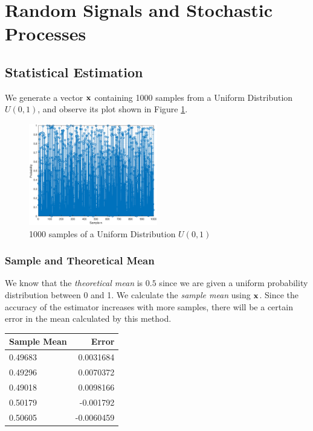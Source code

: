 \documentclass{article}
\begin{document}
\section{Random Signals and Stochastic Processes}
\vspace{0.5cm}

\subsection{Statistical Estimation}

We generate a vector $\bf x$ containing 1000 samples from a Uniform Distribution $U(0,1)$, and observe its plot shown in Figure \ref{fig:mean_norm}. 

\begin{figure}[h!]
\centering
\includegraphics[width=0.5\textwidth]{mean_norm}
\caption{\label{fig:mean_norm} 1000 samples of a Uniform Distribution $U(0,1)$}
\end{figure}

\subsubsection{Sample and Theoretical Mean}

We know that the \textit{theoretical mean} is $0.5$ since we are given a uniform probability distribution between 0 and 1. We calculate the \textit{sample mean} using $\bf x$. Since the accuracy of the estimator increases with more samples, there will be a certain error in the mean calculated by this method.

\begin{table}[h!]
\centering
\begin{tabular}{|l|r|} \hline

Sample Mean	&Error \\ \hline
0.49683		&0.0031684	\\ \hline
0.49296		&0.0070372	\\ \hline
0.49018		&0.0098166	\\ \hline
0.50179		&-0.001792 \\ \hline
0.50605		&-0.0060459	\\ \hline
\end{tabular}
\end{table}
\end{document}
